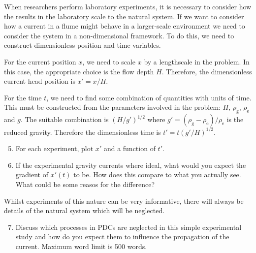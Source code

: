 \documentclass[]{article}
\theoremstyle{definition}
\begin{document}
\begin{enumerate}
When researchers perform laboratory experiments, it is necessary to consider how the results in the laboratory scale to the natural system. If we want to consider how a current in a flume might behave in a larger-scale environment we need to consider the system in a non-dimensional framework. To do this, we need to construct dimensionless position and time variables. 

For the current position $x$, we need to scale $x$ by a lengthscale in the problem. In this case, the appropriate choice is the flow depth $H$. Therefore, the dimensionless current head position is $x' = x / H$.

For the time $t$, we need to find some combination of quantities with units of time. This must be constructed from the parameters involved in the problem: $H$, $\rho_{\text{g}}$, $\rho_{\text{e}}$ and $g$. The suitable combination is $(H / g')^{1/2}$ where $g' = (\rho_{\text{g}} - \rho_{\text{e}}) / \rho_{\text{e}}$ is the reduced gravity. Therefore the dimensionless time is $t' = t (g' / H)^{1/2}$.

\begin{enumerate}\setcounter{enumii}{4}
\item For each experiment, plot $x'$ and a function of $t'$.
\item If the experimental gravity currents where ideal, what would you expect the gradient of $x'(t)$ to be. How does this compare to what you actually see. What could be some reasos for the difference?
\end{enumerate}

Whilst experiments of this nature can be very informative, there will always be details of the natural system which will be neglected.

\begin{enumerate}\setcounter{enumii}{6}
\item Discuss which processes in PDCs are neglected in this simple experimental study and how do you expect them to influence the propagation of the current. Maximum word limit is 500 words.
\end{enumerate}
\end{enumerate}
\end{document}
